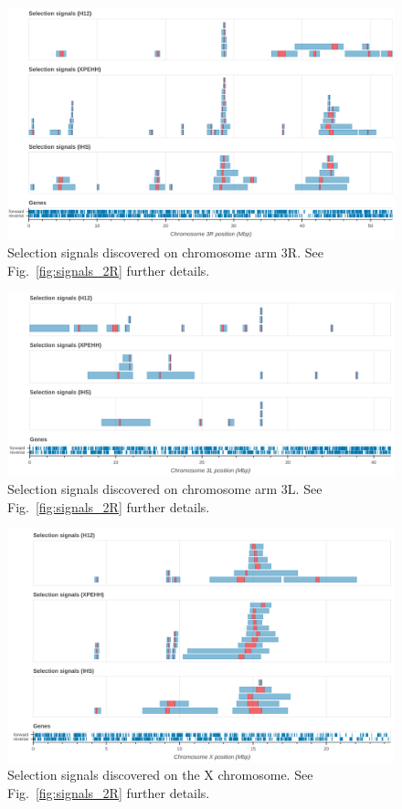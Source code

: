 \documentclass[a4paper,11pt,abstracton,hidelinks]{scrartcl}
\begin{document}
\clearpage
\begin{figure}[h!]
\centering
\includegraphics[width=1.1\textwidth,center]{artwork/chapter5/signals_3R.png}
\caption{Selection signals discovered on chromosome arm 3R.
%
See Fig.~\ref{fig:signals_2R} further details.
}
\label{fig:signals_3R}
\end{figure}


\clearpage
\begin{figure}[h!]
\centering
\includegraphics[width=1.1\textwidth,center]{artwork/chapter5/signals_3L.png}
\caption{Selection signals discovered on chromosome arm 3L.
%
See Fig.~\ref{fig:signals_2R} further details.
}
\label{fig:signals_3L}
\end{figure}


\clearpage
\begin{figure}[h!]
\centering
\includegraphics[width=1.1\textwidth,center]{artwork/chapter5/signals_X.png}
\caption{Selection signals discovered on the X chromosome.
%
See Fig.~\ref{fig:signals_2R} further details.
}
\label{fig:signals_X}
\end{figure}
\end{document}
